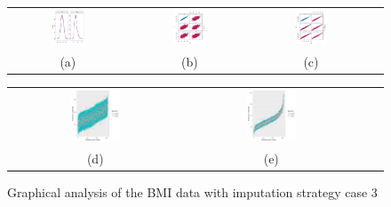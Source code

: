	\begin{figure} [ht!]
		\centering
		\begin{tabular}{cccc}
			\includegraphics[width=0.3\textwidth]{plots/densitycase3} &
			\includegraphics[width=0.3\textwidth]{plots/scattercase3hm} &
			\includegraphics[width=0.3\textwidth]{plots/scattercase3wm} \\
			\textnormal{(a)}  & \textnormal{(b)} & \textnormal{(c)}  \\[6pt]
		\end{tabular}
		\begin{tabular}{cccc}
			\includegraphics[width=0.3\textwidth]{plots/distributioncase3hm} &
			\includegraphics[width=0.3\textwidth]{plots/distributioncase3wm} \\
			\textnormal{(d)}  & \textnormal{(e)}  \\[6pt]
		\end{tabular}
		\caption{Graphical analysis of the BMI data with imputation strategy case 3}
		\label{fig6_11}
	\end{figure}
	
